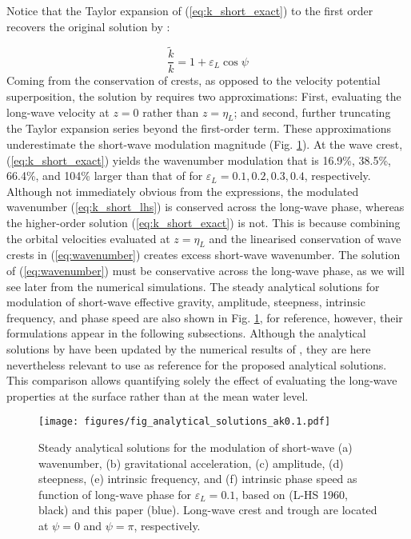 \documentclass[lineno]{jfm}
\begin{document}
Notice that the Taylor expansion of (\ref{eq:k_short_exact}) to the first order
recovers the original solution by \citet{longuet1960changes}:

\begin{equation}
\label{eq:k_short_lhs}
\frac{\widetilde{k}}{k} = 1 + \varepsilon_L \cos{\psi}
\end{equation}
Coming from the conservation of crests, as opposed to the velocity potential
superposition, the solution by \citet{longuet1960changes} requires two
approximations:
First, evaluating the long-wave velocity at $z = 0$ rather than $z = \eta_L$; and
second, further truncating the Taylor expansion series beyond the first-order
term.
These approximations underestimate the short-wave modulation magnitude
(Fig. \ref{fig:analytical_solutions_ak0.1}).
At the wave crest, (\ref{eq:k_short_exact}) yields the wavenumber modulation
that is 16.9\%, 38.5\%, 66.4\%, and 104\% larger than that of
\citet{longuet1960changes} for $\varepsilon_L = 0.1, 0.2, 0.3, 0.4$, respectively.
Although not immediately obvious from the expressions, the modulated wavenumber
(\ref{eq:k_short_lhs}) is conserved across the long-wave phase, whereas
the higher-order solution (\ref{eq:k_short_exact}) is not.
This is because combining the orbital velocities evaluated at $z=\eta_L$ and the
linearised conservation of wave crests in (\ref{eq:wavenumber}) creates excess
short-wave wavenumber.
The solution of (\ref{eq:wavenumber}) must be conservative across the long-wave
phase, as we will see later from the numerical simulations.
The steady analytical solutions for modulation of short-wave effective gravity,
amplitude, steepness, intrinsic frequency, and phase speed are also shown in
Fig. \ref{fig:analytical_solutions_ak0.1}, for reference, however, their
formulations appear in the following subsections.
Although the analytical solutions by \citet{longuet1960changes} have been updated
by the numerical results of \citet{longuet1987propagation}, they are here
nevertheless relevant to use as reference for the proposed analytical solutions.
This comparison allows quantifying solely the effect of evaluating the
long-wave properties at the surface rather than at the mean water level.

\begin{figure}
\centering
\texttt{[image: figures/fig\_analytical\_solutions\_ak0.1.pdf]}
\caption{
  Steady analytical solutions for the modulation of short-wave (a) wavenumber, (b)
  gravitational acceleration, (c) amplitude, (d) steepness, (e) intrinsic
  frequency, and (f) intrinsic phase speed as function of long-wave phase for
  $\varepsilon_L = 0.1$, based on
  \citet{longuet1960changes} (L-HS 1960, black) and this paper (blue).
  Long-wave crest and trough are located at $\psi = 0$ and $\psi = \pi$,
  respectively.
}
\label{fig:analytical_solutions_ak0.1}
\end{figure}
\end{document}

